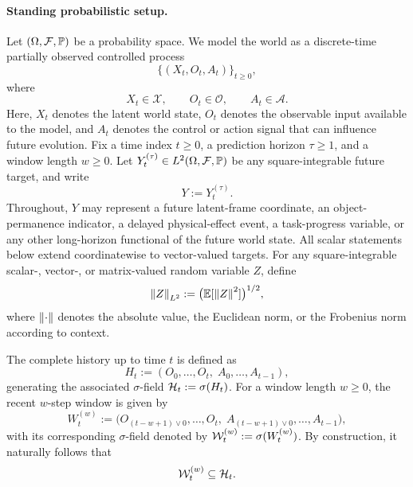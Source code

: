 \paragraph{\textbf{Standing probabilistic setup.}}
Let $(\Omega,\mathcal{F},\mathbb{P})$ be a probability space.
We model the world as a discrete-time partially observed controlled process
\[
\{(X_t,O_t,A_t)\}_{t\ge 0},
\]
where
\[
X_t \in \mathcal X,
\qquad
O_t \in \mathcal O,
\qquad
A_t \in \mathcal A.
\]
Here, $X_t$ denotes the latent world state, $O_t$ denotes the observable input available to the model, and $A_t$ denotes the control or action signal that can influence future evolution. Fix a time index $t\ge 0$, a prediction horizon $\tau \ge 1$, and a window length $w\ge 0$. Let $Y_t^{(\tau)} \in L^2(\Omega,\mathcal{F},\mathbb{P})$
be any square-integrable future target, and write
\[
Y := Y_t^{(\tau)}.
\]
Throughout, $Y$ may represent a future latent-frame coordinate, an object-permanence indicator, a delayed physical-effect event, a task-progress variable, or any other long-horizon functional of the future world state. All scalar statements below extend coordinatewise to vector-valued targets. For any square-integrable scalar-, vector-, or matrix-valued random variable $Z$, define
\[
\left\lVert Z \right\rVert_{L^2} := \bigl(\mathbb{E}[\left\lVert Z \right\rVert^2]\bigr)^{1/2},
\]
where $\left\lVert \cdot \right\rVert$ denotes the absolute value, the Euclidean norm, or the Frobenius norm according to context.

\begin{definition}
\label{def:history_window}
The complete history up to time $t$ is defined as
\begin{equation}
H_t := (O_0,\dots,O_t,\; A_0,\dots,A_{t-1}),
\label{eq:history_def}
\end{equation}
generating the associated $\sigma$-field $\mathcal{H}_t := \sigma(H_t)$. For a  window length $w \ge 0$, the recent $w$-step window is given by
\begin{equation}
W_t^{(w)}
:=
\bigl(
O_{(t-w+1)\vee 0},\dots,O_t,\;
A_{(t-w+1)\vee 0},\dots,A_{t-1}
\bigr),
\label{eq:window_def}
\end{equation}
with its corresponding $\sigma$-field denoted by $\mathcal{W}_t^{(w)} := \sigma(W_t^{(w)})$. By construction, it naturally follows that
\begin{equation}
\mathcal{W}_t^{(w)} \subseteq \mathcal{H}_t.
\label{eq:window_subset_history}
\end{equation}
\end{definition}



